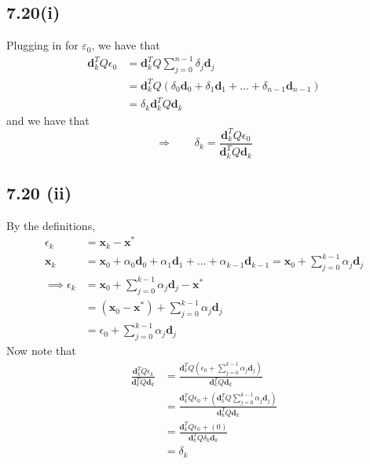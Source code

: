\documentclass[letterpaper,12pt]{article}
\theoremstyle{definition}
\begin{document}
\subsection*{7.20(i)}
Plugging in for $\varepsilon_0$, we have that
			\begin{align*}
            \textbf{d}_k^T Q\epsilon_0 &= \textbf{d}_k^T Q \displaystyle\sum_{j=0}^{n-1}\delta_j\textbf{d}_j \\&= \textbf{d}_k^T Q (\delta_0\textbf{d}_0 + \delta_1\textbf{d}_1 + \ldots + \delta_{n-1}\textbf{d}_{n-1}) \\&= \delta_k\textbf{d}_k^T Q\textbf{d}_k	
			\end{align*}
            and we have that
			\[ \Rightarrow\qquad  \delta_k= \frac{\textbf{d}_k^T Q \epsilon_0}{\textbf{d}_k^T Q\textbf{d}_k}\]

\subsection*{7.20 (ii)}


			By the definitions,
			\begin{align*}
				\epsilon_k &= \textbf{x}_{k} -\textbf{x}^*\\
				\textbf{x}_{k} &= \textbf{x}_{0} + \alpha_0\textbf{d}_0 + \alpha_1\textbf{d}_1 +\ldots + \alpha_{k-1}\textbf{d}_{k-1} = \textbf{x}_{0} + \displaystyle\sum_{j=0}^{k-1}\alpha_j\textbf{d}_j\\
				\implies 
				\epsilon_k &= \textbf{x}_{0} + \displaystyle\sum_{j=0}^{k-1}\alpha_j\textbf{d}_j -\textbf{x}^* \\&= (\textbf{x}_{0}-\textbf{x}^*) + \displaystyle\sum_{j=0}^{k-1}\alpha_j\textbf{d}_j \\&= \epsilon_0 + \displaystyle\sum_{j=0}^{k-1}\alpha_j\textbf{d}_j
			\end{align*}
            Now note that
			\begin{align*}
				\frac{\textbf{d}_k^T Q \epsilon_k}{\textbf{d}_k^T Q\textbf{d}_k} &= \frac{\textbf{d}_k^T Q (\epsilon_0 + \displaystyle\sum_{j=0}^{k-1}\alpha_j\textbf{d}_j)}{\textbf{d}_k^T Q\textbf{d}_k}\\
				&= \frac{\textbf{d}_k^T Q \epsilon_0 + (\textbf{d}_k^T Q \displaystyle\sum_{j=0}^{k-1}\alpha_j\textbf{d}_j)}{\textbf{d}_k^T Q\textbf{d}_k}\\
				&= \frac{\textbf{d}_k^T Q \epsilon_0 + (0)}{\textbf{d}_k^T Q\delta_k\textbf{d}_k} \\&= \delta_k
			\end{align*}
\end{document}
